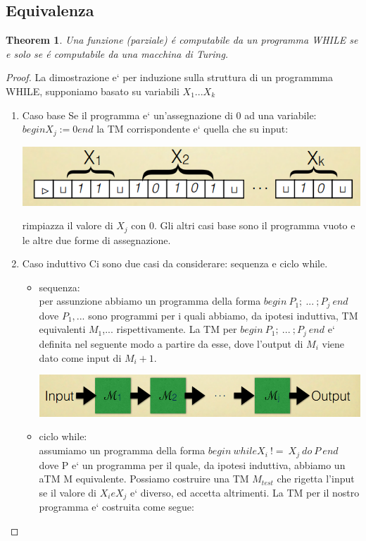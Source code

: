 \documentclass[a4paper, 12pt]{article}
\newtheorem{theorem}{Theorem}[section]
\begin{document}
\subsection{Equivalenza}
\begin{theorem}
Una funzione (parziale) é computabile da un programma WHILE se e solo se é computabile da una macchina di Turing.
\end{theorem}
\begin{proof}
La dimostrazione e` per induzione sulla struttura di un programmma WHILE, supponiamo basato su variabili \(X_1...X_k\)
\begin{enumerate}
\item Caso base
	Se il programma e` un'assegnazione di 0 ad una variabile:
	\(begin X_j := 0 end\) la TM corrispondente e` quella che su input:
	\begin{center}
	\includegraphics[scale=0.5]{while1.png}
	\end{center}
	rimpiazza il valore di \(X_j\) con 0.
	Gli altri casi base sono il programma vuoto e le altre due forme di assegnazione.
\item Caso induttivo
	Ci sono due casi da considerare: sequenza e ciclo while.
	\begin{itemize}
	\item sequenza:\\
		per assunzione abbiamo un programma della forma \(begin\ P_1;\ ...\ ;P_j\ end\)
		dove \(P_1,...\) sono programmi per i quali abbiamo, da ipotesi induttiva, TM equivalenti $M_1$,... rispettivamente. La TM per \( begin\ P_1;\ ...\ ;P_j\ end\) e` definita nel seguente modo a partire da esse, dove l'output di $M_i$ viene dato come input di $M_i+1$.
		\begin{center}
	\includegraphics[scale=0.4]{while2.png}
	\end{center}
	\item ciclo while:\\
	assumiamo un programma della forma \(begin\ while X_{i}\ !=\ X_j\ do\ P\ end\) dove P e` un programma per il quale, da ipotesi induttiva, abbiamo un aTM M  equivalente. Possiamo costruire una TM \(M_{test}\) che rigetta l'input se il valore di \(X_{i} e X_{j}\) e` diverso, ed accetta altrimenti. La TM per il nostro programma e` costruita come segue: 
	

\end{itemize}
\end{enumerate}
\end{proof}
\end{document}
